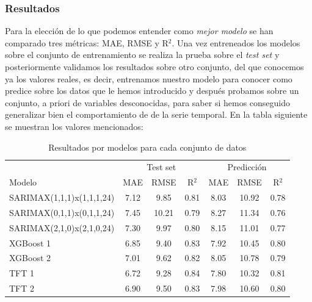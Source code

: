 \subsubsection{Resultados}
%
%
%
Para la elección de lo que podemos entender como \textit{mejor modelo} se han comparado tres métricas: MAE, RMSE y R$^2$. Una vez entreneados los modelos sobre el conjunto de entrenamiento se realiza la prueba sobre el \textit{test set} y posteriormente validamos los resultados sobre otro conjunto, del que conocemos ya los valores reales, es decir, entrenamos nuestro modelo para conocer como predice sobre los datos que le hemos introducido y después probamos sobre un conjunto, a priori de variables desconocidas, para saber si hemos conseguido generalizar bien el comportamiento de de la serie temporal. En la tabla siguiente se muestran los valores mencionados:
\begin{table}[H]
    \centering
    \begin{tabular}{l|ccc|ccc}
        & \multicolumn{3}{c}{Test set} & \multicolumn{3}{c}{Predicción} \\
        Modelo & MAE & RMSE & R$^2$ & MAE & RMSE & R$^2$ \\
        \hline
        SARIMAX(1,1,1)x(1,1,1,24) & 7.12 & 9.85 & 0.81 & 8.03 & 10.92 & 0.78 \\
        SARIMAX(0,1,1)x(0,1,1,24) & 7.45 & 10.21 & 0.79 & 8.27 & 11.34 & 0.76 \\
        SARIMAX(2,1,0)x(2,1,0,24) & 7.30 & 9.97 & 0.80 & 8.15 & 11.01 & 0.77 \\
        XGBoost 1 & 6.85 & 9.40 & 0.83 & 7.92 & 10.45 & 0.80 \\
        XGBoost 2 & 7.01 & 9.62 & 0.82 & 8.05 & 10.78 & 0.79 \\
        TFT 1 & 6.72 & 9.28 & 0.84 & 7.80 & 10.32 & 0.81 \\
        TFT 2 & 6.90 & 9.50 & 0.83 & 7.98 & 10.60 & 0.80 \\
    \end{tabular}
    \caption{Resultados por modelos para cada conjunto de datos}
    \label{tab:resultados_modelos}
\end{table}


